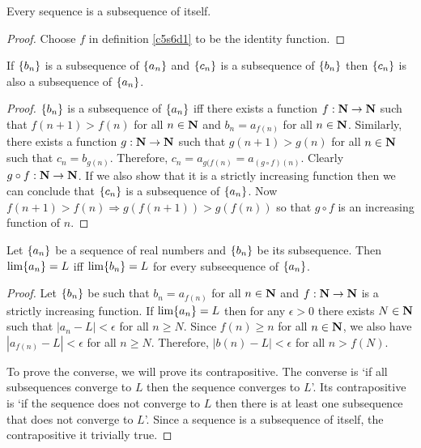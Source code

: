 \begin{lem}\label{c5s6l1}
Every sequence is a subsequence of itself.
\end{lem}
\begin{proof}
Choose $f$ in definition \ref{c5s6d1} to be the identity function.
\end{proof}

\begin{lem}\label{c5s6l2}
If $\{b_n\}$ is a subsequence of $\{a_n\}$ and $\{c_n\}$ is a
subsequence of $\{b_n\}$ then $\{c_n\}$ is also a subsequence of
$\{a_n\}$.
\end{lem}
\begin{proof}
$\{b_n\}$ is a subsequence of $\{a_n\}$ iff there exists a function
$f: \mathbf{N} \rightarrow \mathbf{N}$ such that $f(n + 1) > f(n)$ for all $n \in
\mathbf{N}$ and $b_n = a_{f(n)}$ for all $n \in \mathbf{N}$. Similarly, there exists
a function $g: \mathbf{N} \rightarrow \mathbf{N}$ such that $g(n + 1) > g(n)$ for all
$n \in \mathbf{N}$ such that $c_n = b_{g(n)}$. Therefore, $c_n = a_{g(f(n)} =
a_{(g \circ f)(n)}$. Clearly $g \circ f: \mathbf{N} \rightarrow \mathbf{N}$. If we 
also show that it is a strictly increasing function then we can conclude
that $\{c_n\}$ is a subsequence of $\{a_n\}$. Now $f(n + 1) > f(n)
\Rightarrow g(f(n + 1)) > g(f(n))$ so that $g \circ f$ is an increasing
function of $n$.
\end{proof}

\begin{prop}\label{c5s6p1}
Let $\{a_n\}$ be a sequence of real numbers and $\{b_n\}$ be its
subsequence. Then $\lim\{a_n\} = L$ iff $\lim\{b_n\} = L$ for every
subseequence of $\{a_n\}$.
\end{prop}
\begin{proof}
Let $\{b_n\}$ be such that $b_n = a_{f(n)}$ for all $n \in \mathbf{N}$ and $f:
\mathbf{N} \rightarrow \mathbf{N}$ is a strictly increasing function. If $\lim\{a_n\}
= L$ then for any $\epsilon > 0$ there exists $N \in \mathbf{N}$ such that $|a_n
- L| < \epsilon$ for all $n \ge N$. Since $f(n) \ge n$ for all $n \in \mathbf{N}$,
we also have $|a_{f(n)} - L| < \epsilon$ for all $n \ge N$. Therefore, $
|b(n) - L| < \epsilon$ for all $n > f(N)$.

To prove the converse, we will prove its contrapositive. The converse is
`if all subsequences converge to $L$ then the sequence converges to $L$'.
Its contrapositive is `if the sequence does not converge to $L$ then
there is at least one subsequence that does not converge to $L$'. Since 
a sequence is a subsequence of itself, the contrapositive it trivially 
true.
\end{proof}

